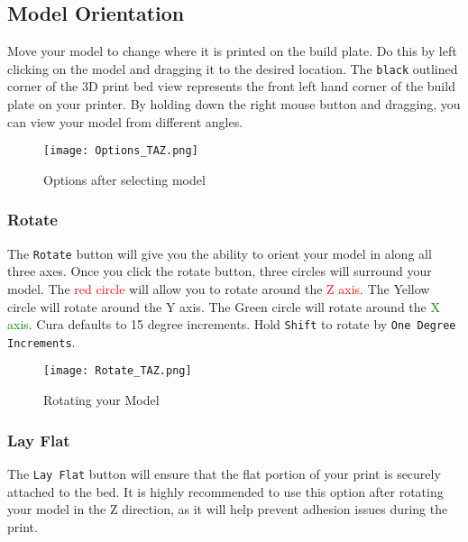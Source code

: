 \subsection{Model Orientation}
Move your model to change where it is printed on the build plate. Do this by left clicking on the model and dragging it to the desired location. The \texttt{black} outlined corner of the 3D print bed view represents the front left hand corner of the build plate on your printer. By holding down the right mouse button and dragging, you can view your model from different angles. %
\begin{figure}[H]
\centering
\texttt{[image: Options\_TAZ.png]}
\caption{Options after selecting model}
\label{fig:Orientation}
\end{figure}

\subsubsection{Rotate}
The \texttt{Rotate} button will give you the ability to orient your model in along all three axes. Once you click the rotate button, three circles will surround your model. The \textcolor{red}{red circle} will allow you to rotate around the \textcolor{red}{Z axis}. The \textcolor{yellow1}{Yellow circle} will rotate around the \textcolor{yellow1}{Y axis}. The \textcolor{green1}{Green circle} will rotate around the \textcolor{green}{X axis}. Cura defaults to 15 degree increments. Hold \texttt{Shift} to rotate by \texttt{One Degree Increments}.
\begin{figure}[H]
\centering
\texttt{[image: Rotate\_TAZ.png]}
\caption{Rotating your Model}
\label{fig:Rotating your Model}
\end{figure}

\subsubsection{Lay Flat}
The \texttt{Lay Flat} button will ensure that the flat portion of your print is securely attached to the bed. It is highly recommended to use this option after rotating your model in the Z direction, as it will help prevent adhesion issues during the print.

